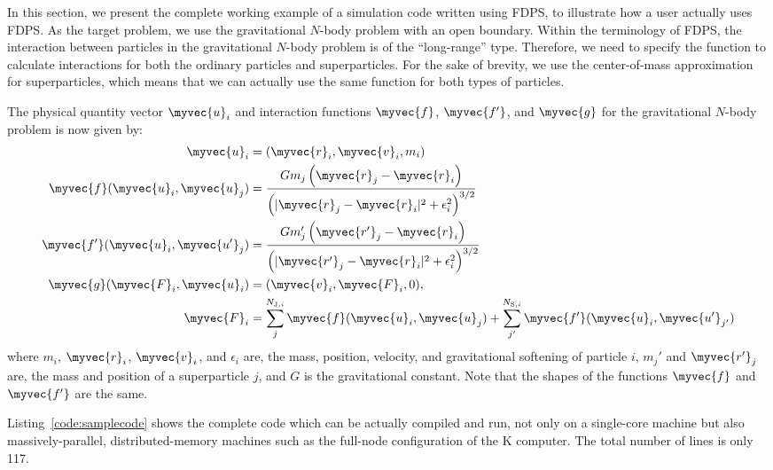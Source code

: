In this section, we present the complete working example of a
simulation code written using FDPS, to illustrate how a user actually
uses FDPS. As the target problem, we use the gravitational $N$-body
problem with an open boundary.  Within the terminology of FDPS, the
interaction between particles in the gravitational $N$-body problem is
of the ``long-range'' type. Therefore, we need to specify the function
to calculate interactions for both the ordinary particles and
superparticles. For the sake of brevity, we use the center-of-mass
approximation for superparticles, which means that we can actually use
the same function for both types of particles.

The physical quantity vector $\myvec{u}_i$ and interaction functions
$\myvec{f}$, $\myvec{f'}$, and $\myvec{g}$ for the gravitational
$N$-body problem is now given by:
\begin{align}
  \myvec{u}_i &= (\myvec{r}_i,
  \myvec{v}_i,m_i) \label{eq:PhysicalVectorNbody} \\
  \myvec{f} (\myvec{u}_i, \myvec{u}_j) &= \frac{Gm_j \left(
    \myvec{r}_j - \myvec{r}_i \right)}{ \left( |\myvec{r}_j -
    \myvec{r}_i|^2 + \epsilon_i^2
    \right)^{3/2}} \label{eq:ParticleParticleNbody} \\
  \myvec{f'} (\myvec{u}_i, \myvec{u'}_j) &= \frac{Gm_j' \left(
    \myvec{r'}_j - \myvec{r}_i \right)}{ \left( |\myvec{r'}_j -
    \myvec{r}_i|^2 + \epsilon_i^2
    \right)^{3/2}} \label{eq:ParticleSuperparticleNbody} \\
  \myvec{g}(\myvec{F}_i,\myvec{u}_i) &= (\myvec{v}_i,\myvec{F}_i,0),
\label{eq:ConversionNbody} \\
  \myvec{F}_i
  &= \sum_j^{N_{\mathrm{J},i}} \myvec{f}(\myvec{u}_i,\myvec{u}_j)
  + \sum_{j'}^{N_{\mathrm{S},i}} \myvec{f'}(\myvec{u}_i,\myvec{u'}_{j'})
\end{align}
where $m_i$, $\myvec{r}_i$, $\myvec{v}_i$, and $\epsilon_i$ are, the
mass, position, velocity, and gravitational softening of particle $i$,
$m_j'$ and $\myvec{r'}_j$ are, the mass and position of a
superparticle $j$, and $G$ is the gravitational constant.  Note that
the shapes of the functions $\myvec{f}$ and $\myvec{f'}$ are the same.



Listing~\ref{code:samplecode} shows the complete code which can be
actually compiled and run, not only on a single-core machine but also
massively-parallel, distributed-memory machines such as the full-node
configuration of the K computer. The total number of lines is only
117.

